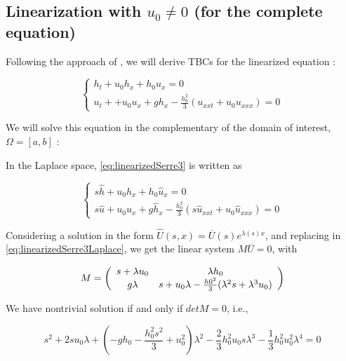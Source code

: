 \subsection{Linearization with $u_0 \neq 0$ (for the complete equation)}

\indent Following the approach of \cite{besse2015}, we will derive TBCs for the linearized equation :

\begin{equation}
\label{eq:linearizedSerre3} 
\begin{cases}
h_t + u_0h_x + h_0u_x = 0 \\
u_t +  + u_0u_x + gh_x - \frac{h_0^2}{3}(u_{xxt}+u_0u_{xxx}) = 0
\end{cases}
\end{equation} 

\indent We will solve this equation in the complementary of the domain of interest, $\Omega=[a,b]$ :

\indent In the Laplace space, \eqref{eq:linearizedSerre3} is written as

\begin{equation}
\label{eq:linearizedSerre3Laplace} 
\begin{cases}
s\hat{h} + u_0\hat{h}_x + h_0\hat{u}_x = 0 \\
s\hat{u} +  u_0u_x + g\hat{h}_x - \frac{h_0^2}{3}(s\hat{u}_{xxt}+u_0\hat{u}_{xxx})  = 0
\end{cases}
\end{equation} 

\indent Considering a solution in the form $\hat{U}(s,x) = \overline{U}(s)e^{\lambda(s)x}$, and replacing in \eqref{eq:linearizedSerre3Laplace}, we get the linear system $M\overline{U} = 0$, with

\begin{equation*}
M = \left( \begin{array}{c c}
						s + \lambda u_0 & \lambda h_0 \\
						g\lambda & s + u_0\lambda - \frac{h0^2}{3}(\lambda^2 s + \lambda^3 u_0)
				\end{array}
	\right)
\end{equation*}

\indent We have nontrivial solution if and only if $detM = 0$, i.e.,

\begin{equation}
\label{eq:pol4}
s^2 + 2su_0 \lambda + \left( -gh_0 - \frac{h_0^2 s^2}{3} + u_0^2 \right)\lambda^2 - \frac{2}{3}h_0^2u_0s\lambda^3 - \frac{1}{3}h_0^2u_0^2\lambda^4 = 0 
\end{equation}

